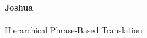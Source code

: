\begin{titlepage}
\begin{center}

{\huge \bfseries
Joshua\\
\ \\
}
%
%
{ \Large
Hierarchical Phrase-Based Translation
\\} 
%
\ \\ %
\ \\ %
\ \\ %
\ \\ %
\ \\ %
\ \\ %
\ \\ %
\ \\ %
\ \\ %
\ \\ %
\ \\ %
\ \\ %
\ \\ %
\ \\ %
\ \\ %
\ \\ %
\ \\ %
\ \\ %
\ \\ %
\ \\ %
\ \\ %
\ \\ %
\ \\ %
\ \\ %
\ \\ %
\ \\ %


\end{center}
\end{titlepage}
